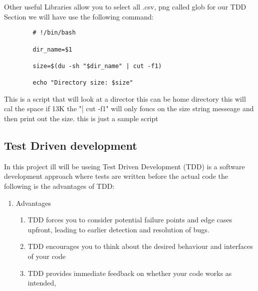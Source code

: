 	Other useful Libraries allow you to  select all  .csv, png  called glob
	for our TDD Section we will have  use the  following command:
	\label{TDD sample bash}
	\begin{verbatim}
		# !/bin/bash

		dir_name=$1

		size=$(du -sh "$dir_name" | cut -f1)

		echo "Directory size: $size"
	\end{verbatim}
	This is a script that will look at a  director this can be home directory  this will cal the  space if 13K
	the "| cut -f1" will only foucs on the  size string messeage and then print out the  size. this is  just  a sample  script 
	\subsection{Test Driven development}
	In this  project ill will be useing  Test Driven Development (TDD) is a software development approach where tests are written before the actual code
	the following is the advantages of TDD:
	\begin{enumerate}
		\item Advantages
		\begin{enumerate}
			\item TDD forces you to consider potential failure points and edge cases upfront, leading to earlier detection and resolution of bugs.
			\item TDD encourages you to think about the desired behaviour and interfaces of your code
			\item TDD provides immediate feedback on whether your code works as intended,
		\end{enumerate}
	\end{enumerate}

